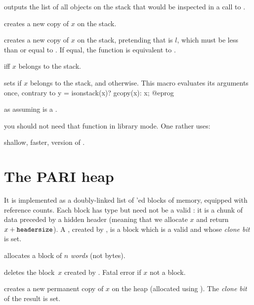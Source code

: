  outputs the list of all objects on the
stack that would be inspected in a call to .


 creates a new copy of $x$ on the stack.

 creates a new copy of $x$
on the stack, pretending that  is $l$, which must be less than or
equal to . If equal, the function is equivalent to .

  iff $x$ belongs to the stack.

 sets  if
$x$ belongs to the stack, and  otherwise. This macro evaluates
its arguments once, contrary to
\bprog
  y = isonstack(x)? gcopy(x): x;
@eprog

 as  assuming 
is a .


 you should not need that function in library mode.
One rather uses:

 shallow, faster, version of .

\section{The PARI heap}

It is implemented as a doubly-linked list of 'ed blocks of
memory, equipped with reference counts. Each block has type  but need
not be a valid : it is a chunk of data preceded by a hidden header
(meaning that we allocate $x$ and return $x + {\tt header size}$). A
, created by , is a block which is a valid 
and whose \emph{clone bit} is set.


 allocates a block of $n$ \emph{words} (not bytes).

 deletes the block~$x$ created by .
Fatal error if $x$ not a block.

 creates a new permanent copy of $x$ on the heap
(allocated using ). The \emph{clone bit} of the result is set.

